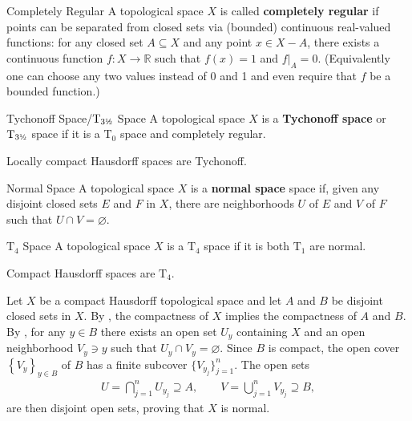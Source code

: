 \documentclass{report}
\begin{document}
\begin{definition}{Completely Regular}{}
	A topological space $X$ is called \textbf{completely regular} if points can be separated from closed sets via (bounded) continuous real-valued functions: for any closed set $A \subseteq X$ and any point $x \in X - A$, there exists a continuous function $f: X \rightarrow \mathbb{R}$ such that $f(x)=1$ and $\left.f\right|_A=0$. (Equivalently one can choose any two values instead of 0 and 1 and even require that $f$ be a bounded function.)
\end{definition}

\begin{definition}{Tychonoff Space/$\mathrm{T}_{3 \text{\textonehalf}}$ Space}{}
	A topological space $X$ is a \textbf{Tychonoff space} or $\mathrm{T}_{3\text{\textonehalf}}$ space if it is a $\mathrm{T}_0$ space and completely regular.
\end{definition}

\begin{proposition}{}{}
	Locally compact Hausdorff spaces are Tychonoff.
\end{proposition}


\begin{definition}{Normal Space}{}
	A topological space $X$ is a \textbf{normal space} space if, given any disjoint closed sets $E$ and $F$ in $X$, there are neighborhoods $U$ of $E$ and $V$ of $F$ such that $U\cap V=\varnothing$.
\end{definition}
\begin{definition}{$\mathrm{T}_4$ Space}{}
	A topological space $X$ is a $\mathrm{T}_4$ space if it is both $\mathrm{T}_1$ are normal.
\end{definition}


\begin{proposition}{}{}
	Compact Hausdorff spaces are $\mathrm{T}_4$.
\end{proposition}
\begin{prf}
	Let $X$ be a compact Hausdorff topological space and let $A$ and $B$ be disjoint closed sets in $X$. By , the compactness of $X$ implies the compactness of $A$ and $B$. By , for any $y\in B$ there exists an open set $U_y$ containing $X$ and an open neighborhood $V_y\ni y$ such that $U_y\cap V_y =\varnothing$. Since $B$ is compact, the open cover $\left\lbrace V_y\right\rbrace _{y\in B}$ of $B$ has a finite subcover $\{V_{y_j}\}_{j=1}^n$. The open sets 
\begin{align*}
U=\bigcap_{j=1}^n U_{y_j} \supseteq A,  \qquad V=\bigcup_{j=1}^n V_{y_j} \supseteq B,
\end{align*}
are then disjoint open sets, proving that $X$ is normal.
\end{prf}
\end{document}
